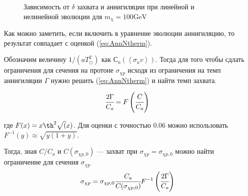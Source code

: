 \documentclass[a4paper, 14pt]{article}
\newcommand{\avarage}[1]{\left\langle #1 \right\rangle}
\begin{document}
\begin{figure}[!h]
	\centering
	\caption{Зависимость от $\delta$ захвата и аннигиляции при линейной и нелинейной эволюции для $m_{\chi} = 100\text{GeV}$}
	\label{plot:CaptAnn}
\end{figure}

Как можно заметить, если включить в уравнение эволюции аннигиляцию, то результат совпадает с оценкой (\ref{eq:AnnNtherm}). 

Обозначим величину $1/(aT_{\odot}^2)$ как $С_a(\avarage{\sigma_a v})$. Тогда для того чтобы сдлать ограничения для сечения на протоне $\sigma_{\chi p}$ исходя из ограничения на темп аннигиляции $\Gamma$ нужно решить (\ref{eq:AnnNtherm}) и найти темп захвата.

\begin{equation}
	\cfrac{2\Gamma}{C_a} = 
	F\left(\cfrac{C}{C_a}\right)
\end{equation}

где $F(x) = x\th^2{\sqrt(x)}$. Для оценки с точностью $0.06$ можно использовать $F^{-1}(y) \approx \sqrt{y(1+y)}$.

Тогда, зная $C/C_a$ и $C(\sigma_{\chi p,0})$ --- захват при $\sigma_{\chi p} = \sigma_{\chi p, 0}$ можно найти ограничение для сечения $\sigma_{\chi p}$
\begin{equation}
	\sigma_{\chi p} = \sigma_{\chi p, 0} \cfrac{C_a}{C(\sigma_{\chi p,0})} F^{-1}\left(	\cfrac{2\Gamma}{C_a}\right)
\end{equation}
\end{document}
